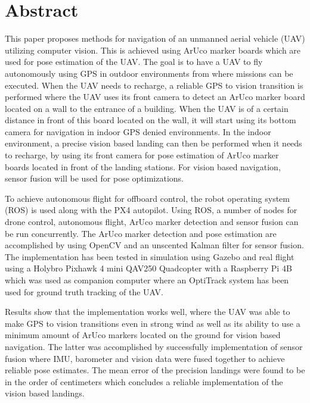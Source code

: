 \documentclass[../Head/report.tex]{subfiles}
\begin{document}
\thispagestyle{empty}
\section*{Abstract}

This paper proposes methods for navigation of an unmanned aerial vehicle (UAV) utilizing computer vision. This is achieved using ArUco marker boards which are used for pose estimation of the UAV. The goal is to have a UAV to fly autonomously using GPS in outdoor environments from where missions can be executed. When the UAV needs to recharge, a reliable GPS to vision transition is performed where the UAV uses its front camera to detect an ArUco marker board located on a wall to the entrance of a building. When the UAV is of a certain distance in front of this board located on the wall, it will start using its bottom camera for navigation in indoor GPS denied environments. In the indoor environment, a precise vision based landing can then be performed when it needs to recharge, by using its front camera for pose estimation of ArUco marker boards located in front of the landing stations. For vision based navigation, sensor fusion will be used for pose optimizations.

To achieve autonomous flight for offboard control, the robot operating system (ROS) is used along with the PX4 autopilot. Using ROS, a number of nodes for drone control, autonomous flight, ArUco marker detection and sensor fusion can be run concurrently. The ArUco marker detection and pose estimation are accomplished by using OpenCV and an unscented Kalman filter for sensor fusion. The implementation has been tested in simulation using Gazebo and real flight using a Holybro Pixhawk 4 mini QAV250 Quadcopter with a Raspberry Pi 4B which was used as companion computer where an OptiTrack system has been used for ground truth tracking of the UAV.

Results show that the implementation works well, where the UAV was able to make GPS to vision transitions even in strong wind as well as its ability to use a minimum amount of ArUco markers located on the ground for vision based navigation. The latter was accomplished by successfully implementation of sensor fusion where IMU, barometer and vision data were fused together to achieve reliable pose estimates. The mean error of the precision landings were found to be in the order of centimeters which concludes a reliable implementation of the vision based landings.     
\end{document}
